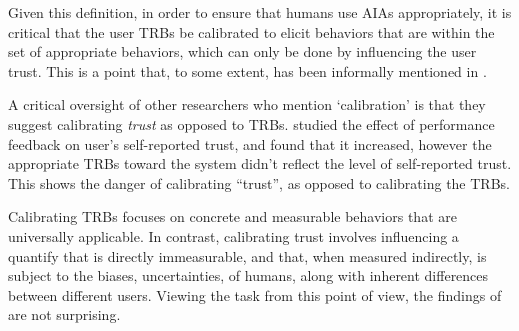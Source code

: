     Given this definition, in order to ensure that humans use AIAs appropriately, it is critical that the user TRBs be calibrated to elicit behaviors that are within the set of appropriate behaviors, which can only be done by influencing the user trust. This is a point that, to some extent, has been informally mentioned in \citet{Muir1994-ow,Muir1987-mk,Lillard2016-yg,Lee2004-pv,Hutchins2015-if}.

    A critical oversight of other researchers who mention `calibration' is that they suggest calibrating \emph{trust} as opposed to TRBs. \citet{Dzindolet2003-ts} studied the effect of performance feedback on user's self-reported trust, and found that it increased, however the appropriate TRBs toward the system didn't reflect the level of self-reported trust. This shows the danger of calibrating ``trust'', as opposed to calibrating the TRBs.

    Calibrating TRBs focuses on concrete and measurable behaviors that are universally applicable. In contrast, calibrating trust involves influencing a quantify that is directly immeasurable, and that, when measured indirectly, is subject to the biases, uncertainties, of humans, along with inherent differences between different users. Viewing the task from this point of view, the findings of \citeauthor{Dzindolet2003-ts} are not surprising.


